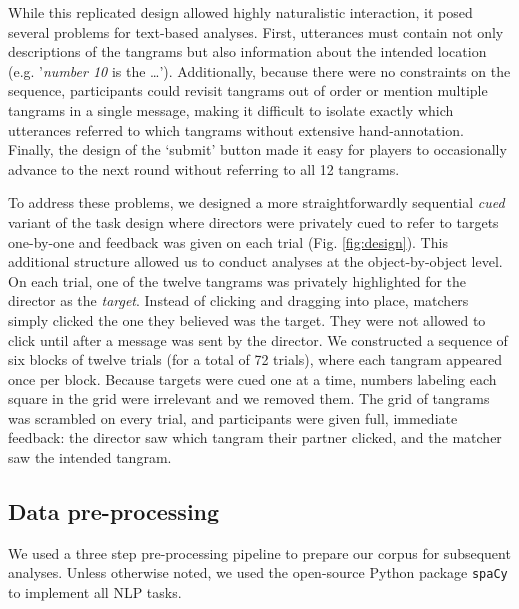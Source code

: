 \documentclass[alpha-refs]{wiley-article}
\begin{document}
While this replicated design allowed highly naturalistic interaction, it posed several problems for text-based analyses. 
First, utterances must contain not only descriptions of the tangrams but also information about the intended location (e.g. '\emph{number 10} is the \dots'). 
Additionally, because there were no constraints on the sequence, participants could revisit tangrams out of order or mention multiple tangrams in a single message, making it difficult to isolate exactly which utterances referred to which tangrams without extensive hand-annotation. 
Finally, the design of the `submit' button made it easy for players to occasionally advance to the next round without referring to all 12 tangrams. 

To address these problems, we designed a more straightforwardly sequential \emph{cued} variant of the task design where directors were privately cued to refer to targets one-by-one and feedback was given on each trial (Fig. \ref{fig:design}).
This additional structure allowed us to conduct analyses at the object-by-object level. 
On each trial, one of the twelve tangrams was privately highlighted for the director as the \emph{target}. 
Instead of clicking and dragging into place, matchers simply clicked the one they believed was the target. 
They were not allowed to click until after a message was sent by the director.  
We constructed a sequence of six blocks of twelve trials (for a total of 72 trials), where each tangram appeared once per block.
Because targets were cued one at a time, numbers labeling each square in the grid were irrelevant and we removed them. 
The grid of tangrams was scrambled on every trial, and participants were given full, immediate feedback: the director saw which tangram their partner clicked, and the matcher saw the intended tangram.

\subsection{Data pre-processing}

We used a three step pre-processing pipeline to prepare our corpus for subsequent analyses. Unless otherwise noted, we used the open-source Python package \texttt{spaCy} to implement all NLP tasks. 
\end{document}
